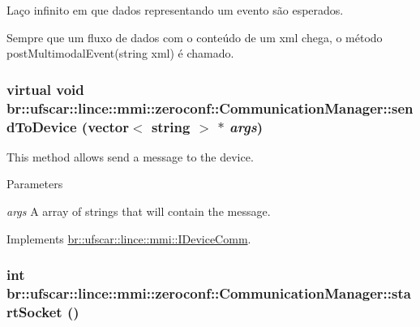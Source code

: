 Laço infinito em que dados representando um evento são esperados. 

Sempre que um fluxo de dados com o conteúdo de um xml chega, o método postMultimodalEvent(string xml) é chamado. \hypertarget{classbr_1_1ufscar_1_1lince_1_1mmi_1_1zeroconf_1_1CommunicationManager_a40b30969966a6517d21cf9a1cf5c3da8}{
\subsubsection[{sendToDevice}]{\setlength{\rightskip}{0pt plus 5cm}virtual void br::ufscar::lince::mmi::zeroconf::CommunicationManager::sendToDevice (vector$<$ string $>$ $\ast$ {\em args})}}
\label{classbr_1_1ufscar_1_1lince_1_1mmi_1_1zeroconf_1_1CommunicationManager_a40b30969966a6517d21cf9a1cf5c3da8}


This method allows send a message to the device. 


\begin{DoxyParams}{Parameters}
\item[{\em args}]A array of strings that will contain the message. \end{DoxyParams}


Implements \hyperlink{classbr_1_1ufscar_1_1lince_1_1mmi_1_1IDeviceComm_a0249a13030b4df9b50778723421375d9}{br::ufscar::lince::mmi::IDeviceComm}.

\hypertarget{classbr_1_1ufscar_1_1lince_1_1mmi_1_1zeroconf_1_1CommunicationManager_ae914529050d209469d98e2f03e42ce85}{
\subsubsection[{startSocket}]{\setlength{\rightskip}{0pt plus 5cm}int br::ufscar::lince::mmi::zeroconf::CommunicationManager::startSocket ()}}
\label{classbr_1_1ufscar_1_1lince_1_1mmi_1_1zeroconf_1_1CommunicationManager_ae914529050d209469d98e2f03e42ce85}


